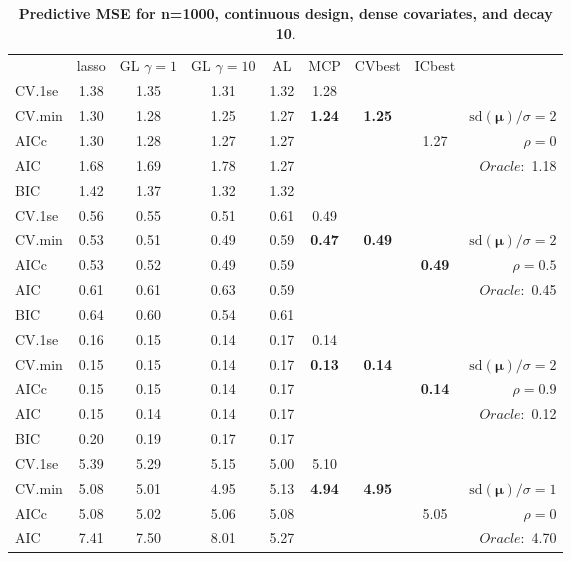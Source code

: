\clearpage
\begin{table}\vspace{-.5cm}
\caption[l]{ { \bf Predictive MSE for n=1000, continuous design, 
dense covariates, and  decay  10}.}
\vspace{-.5cm}
\footnotesize{}
\begin{center}
\begin{tabular}{l*{7}{c}|r}
 & lasso & GL $\gamma=1$ & GL $\gamma=10$ & AL & MCP  & CVbest & ICbest  \\
\cline{1-9}
CV.1se & 1.38 & 1.35 & 1.31 & 1.32 & 1.28 & & & \\
CV.min & 1.30 & 1.28 & 1.25 & 1.27 & {\bf 1.24} & {\bf 1.25} & & $\mathrm{sd}(\mathbf{\mu})/\sigma=2$ \\
AICc & 1.30 & 1.28 & 1.27 & 1.27 & & & 1.27 &  $\rho=0$ \\
AIC & 1.68 & 1.69 & 1.78 & 1.27 & & & &  \multirow{2}{*}{$Oracle: $ 1.18} \\
BIC & 1.42 & 1.37 & 1.32 & 1.32 & & & &  \\
 \hline 
CV.1se & 0.56 & 0.55 & 0.51 & 0.61 & 0.49 & & & \\
CV.min & 0.53 & 0.51 & 0.49 & 0.59 & {\bf 0.47} & {\bf 0.49} & & $\mathrm{sd}(\mathbf{\mu})/\sigma=2$ \\
AICc & 0.53 & 0.52 & 0.49 & 0.59 & & & {\bf 0.49} &  $\rho=0.5$ \\
AIC & 0.61 & 0.61 & 0.63 & 0.59 & & & &  \multirow{2}{*}{$Oracle: $ 0.45} \\
BIC & 0.64 & 0.60 & 0.54 & 0.61 & & & &  \\
 \hline 
CV.1se & 0.16 & 0.15 & 0.14 & 0.17 & 0.14 & & & \\
CV.min & 0.15 & 0.15 & 0.14 & 0.17 & {\bf 0.13} & {\bf 0.14} & & $\mathrm{sd}(\mathbf{\mu})/\sigma=2$ \\
AICc & 0.15 & 0.15 & 0.14 & 0.17 & & & {\bf 0.14} &  $\rho=0.9$ \\
AIC & 0.15 & 0.14 & 0.14 & 0.17 & & & &  \multirow{2}{*}{$Oracle: $ 0.12} \\
BIC & 0.20 & 0.19 & 0.17 & 0.17 & & & &  \\
 \hline 
CV.1se & 5.39 & 5.29 & 5.15 & 5.00 & 5.10 & & & \\
CV.min & 5.08 & 5.01 & 4.95 & 5.13 & {\bf 4.94} & {\bf 4.95} & & $\mathrm{sd}(\mathbf{\mu})/\sigma=1$ \\
AICc & 5.08 & 5.02 & 5.06 & 5.08 & & & 5.05 &  $\rho=0$ \\
AIC & 7.41 & 7.50 & 8.01 & 5.27 & & & &  \multirow{2}{*}{$Oracle: $ 4.70} \\

\end{tabular}
\end{center}
\end{table}
